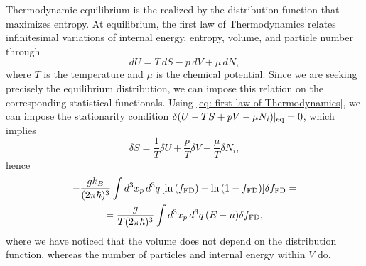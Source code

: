 Thermodynamic equilibrium is the realized by the distribution function that maximizes entropy. At equilibrium, the first law of Thermodynamics relates infinitesimal variations of internal energy, entropy, volume, and particle number through 
\begin{equation}
\label{eq: first law of Thermodynamics}
    dU = T\,dS - p\,dV + \mu\,dN,
\end{equation}
where $T$ is the temperature and $\mu$ is the chemical potential.  Since we are seeking precisely the equilibrium distribution, we can impose this relation on the corresponding statistical functionals. Using \eqref{eq: first law of Thermodynamics}, we can impose the stationarity condition $\delta(U - TS + pV - \mu N_i)|_{\mathrm{eq}} = 0$, which implies 
\begin{equation}
    \delta S = \frac{1}{T}\delta U + \frac{p}{T}\delta V - \frac{\mu}{T}\delta N_i,
\end{equation}
hence 
\begin{multline}
    -\frac{g k_B}{(2\pi\hbar)^3}\int d^3x_p\,d^3q\,[\ln{(f_{\mathrm{FD}})} - \ln{(1 - f_{\mathrm{FD}})}]\delta f_{\mathrm{FD}} = \\
     = \frac{g}{T(2\pi\hbar)^3}\int d^3x_p\,d^3q\,(E - \mu)\delta f_{\mathrm{FD}},
\end{multline}
where we have noticed that the volume does not depend on the distribution function, whereas the number of particles and internal energy within $V$ do. 

